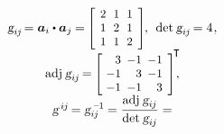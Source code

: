 \begin{otherlanguage}{russian}
\begin{tcolorbox}
\[\begin{array}{c}
\textsl{g}_{i\hspace{-0.1ex}j} \hspace{-0.32ex} = \bm{a}_i \dotp \bm{a}_j \hspace{-0.12ex} = \hspace{-0.16ex}
\scalebox{0.92}[0.92]{$\left[\hspace{-0.16ex}\begin{array}{c@{\hspace{.64em}}c@{\hspace{.64em}}c}
2 & 1 & 1 \\
1 & 2 & 1 \\
1 & 1 & 2
\end{array}\hspace{-0.12ex}\right]$} \hspace{-0.2ex}, \:\:
\operatorname{det} \hspace{.12ex} \textsl{g}_{i\hspace{-0.1ex}j} \hspace{-0.25ex} = 4 \hspace{.16ex}, \\
%
\operatorname{adj} \hspace{.12ex} \textsl{g}_{i\hspace{-0.1ex}j} \hspace{-0.25ex} = \hspace{-0.16ex}
\scalebox{0.92}[0.92]{$\left[\hspace{-0.4ex}\begin{array}{r@{\hspace{.5em}}r@{\hspace{.5em}}r}
3 & -1 & -1 \\
-1 & 3 & -1 \\
-1 & -1 & 3
\end{array}\hspace{-0.12ex}\right]^{\hspace{-0.4ex}\scalebox{1.02}{$\T$}}$} \hspace{-0.8ex}, \\
%
\textsl{g}^{\hspace{.32ex}i\hspace{-0.1ex}j} \hspace{-0.25ex} = \textsl{g}_{i\hspace{-0.1ex}j}^{\hspace{.4ex}\expminusone} \hspace{-0.12ex} = \displaystyle \frac{\operatorname{adj} \hspace{.12ex} \textsl{g}_{i\hspace{-0.1ex}j}}{\operatorname{det} \hspace{.12ex} \textsl{g}_{i\hspace{-0.1ex}j}} =

\end{array}\]
\end{tcolorbox}
\end{otherlanguage}
